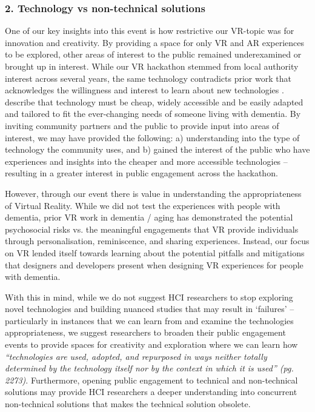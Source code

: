 \subsubsection{2. Technology vs non-technical solutions}
\label{Techvsnontech}

One of our key insights into this event is how restrictive our VR-topic was for innovation and creativity. By providing a space for only VR and AR experiences to be explored, other areas of interest to the public remained underexamined or brought up in interest. While our VR hackathon stemmed from local authority interest across several years, the same technology contradicts prior work that acknowledges the willingness and interest to learn about new technologies \citep{astell_using_2019}.  \cite{lorenz2019technology} describe that technology must be cheap, widely accessible and be easily adapted and tailored to fit the ever-changing needs of someone living with dementia. By inviting community partners and the public to provide input into areas of interest, we may have provided the following: a) understanding into the type of technology the community uses, and b) gained the interest of the public who have experiences and insights into the cheaper and more accessible technologies – resulting in a greater interest in public engagement across the hackathon.

However, through our event there is value in understanding the appropriateness of Virtual Reality. While we did not test the experiences with people with dementia, prior VR work in dementia / aging has demonstrated the potential psychosocial risks vs. the meaningful engagements that VR provide individuals through personalisation, reminiscence, and sharing experiences. Instead, our focus on VR lended itself towards learning about the potential pitfalls and mitigations that designers and developers present when designing VR experiences for people with dementia. 

With this in mind, while we do not suggest HCI researchers to stop exploring novel technologies and building nuanced studies that may result in ‘failures’ – particularly in instances that we can learn from and examine the technologies appropriateness, we suggest researchers to broaden their public engagement events to provide spaces for creativity and exploration where we can learn how \textit{“technologies are used, adopted, and repurposed in ways neither totally determined by the technology itself nor by the context in which it is used” (pg. 2273)\citep{baumer2011implication}}. Furthermore, opening public engagement to technical and non-technical solutions may provide HCI researchers a deeper understanding into concurrent non-technical solutions that makes the technical solution obsolete.

